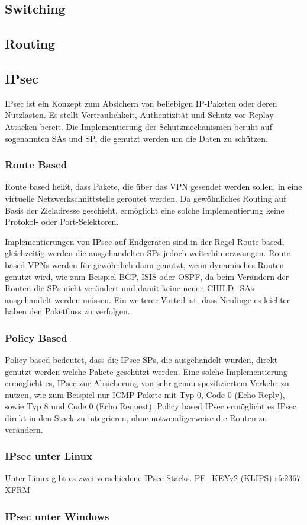 \subsection{Switching}
\subsection{Routing}
\subsection{IPsec}
\ac{IPsec} ist ein Konzept zum Absichern von beliebigen \ac{IP}-Paketen oder deren Nutzlasten.
Es stellt Vertraulichkeit, Authentizität und Schutz vor Replay-Attacken bereit.
Die Implementierung der Schutzmechanismen beruht auf sogenannten \acp{SA} und \ac{SP},
die genutzt werden um die Daten zu schützen.
\subsubsection{Route Based}
Route based heißt, dass Pakete, die über das VPN
gesendet werden sollen, in eine virtuelle Netzwerkschnittstelle geroutet werden.
Da gewöhnliches Routing auf Basis der Zieladresse geschieht, ermöglicht eine solche Implementierung
keine Protokol- oder Port-Selektoren.

Implementierungen von IPsec auf Endgeräten sind in der Regel Route based, gleichzeitig werden
die ausgehandelten \acp{SP} jedoch weiterhin erzwungen.
Route based \acp{VPN} werden für gewöhnlich dann genutzt, wenn dynamisches Routen genutzt wird,
wie zum Beispiel \ac{BGP}, \ac{ISIS} oder \ac{OSPF}, da beim Verändern der Routen die \acp{SP} nicht verändert
und damit keine neuen CHILD\_SAs ausgehandelt werden müssen. Ein weiterer Vorteil ist, dass Neulinge es leichter haben
den Paketfluss zu verfolgen.
\subsubsection{Policy Based}
Policy based bedeutet, dass die \ac{IPsec}-\acp{SP}, die ausgehandelt wurden, direkt genutzt werden welche Pakete geschützt werden.
Eine solche Implementierung ermöglicht es, \ac{IPsec} zur Absicherung von sehr genau spezifiziertem
Verkehr zu nutzen, wie zum Beispiel nur \ac{ICMP}-Pakete mit Typ 0, Code 0 (Echo Reply), sowie Typ 8 und Code 0 (Echo Request).
Policy based \ac{IPsec} ermöglicht es \ac{IPsec} direkt in den Stack zu integrieren, ohne notwendigerweise die Routen zu verändern.
\subsubsection{IPsec unter Linux}
Unter Linux gibt es zwei verschiedene \ac{IPsec}-Stacks. 
PF\_KEYv2 (KLIPS) rfc2367
XFRM
\subsubsection{IPsec unter Windows}
